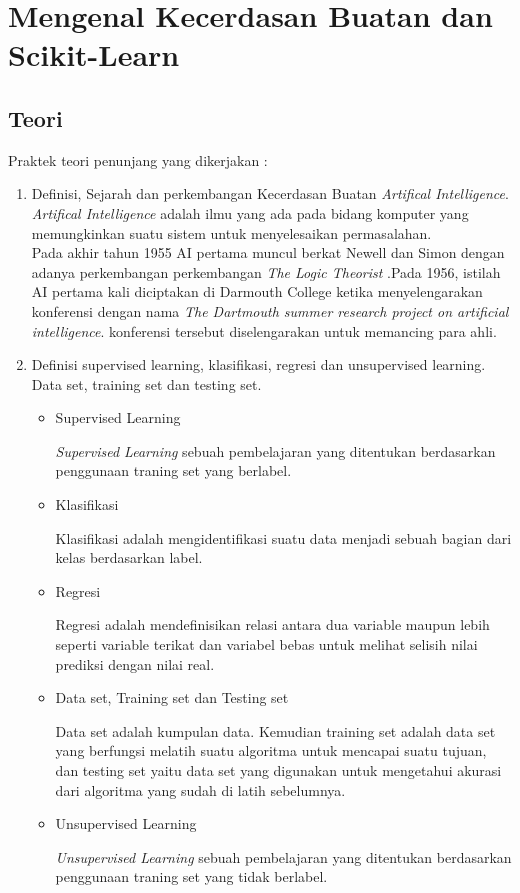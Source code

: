 \chapter{Mengenal Kecerdasan Buatan dan Scikit-Learn}

\section{Teori}
Praktek teori penunjang yang dikerjakan :
\begin{enumerate}
\item
Definisi, Sejarah dan perkembangan Kecerdasan Buatan \textit{Artifical Intelligence}. \textit{Artifical Intelligence} adalah  ilmu yang ada pada bidang komputer yang memungkinkan  suatu sistem  untuk menyelesaikan permasalahan.\\
Pada akhir tahun 1955 AI pertama muncul berkat Newell dan Simon dengan adanya perkembangan perkembangan \textit{The Logic Theorist} .Pada 1956, istilah AI pertama kali diciptakan di Darmouth College ketika menyelengarakan konferensi dengan nama \textit{The Dartmouth summer research project on artificial intelligence}. konferensi tersebut diselengarakan untuk memancing para ahli.

\item
Definisi supervised learning, klasifikasi, regresi dan unsupervised learning. Data set, training set dan testing set.
\begin{itemize}

	\item Supervised Learning
    \par
    \textit{Supervised Learning} sebuah pembelajaran yang ditentukan berdasarkan penggunaan traning set yang berlabel.

    \item Klasifikasi
    \par
    Klasifikasi adalah mengidentifikasi suatu data menjadi sebuah bagian dari kelas berdasarkan label.

	\item Regresi
	\par 
	Regresi adalah mendefinisikan relasi antara dua variable maupun lebih seperti variable terikat dan variabel bebas untuk melihat selisih nilai prediksi dengan nilai real.

    \item Data set, Training set dan Testing set
    \par
    Data set adalah kumpulan data. Kemudian training set adalah  data set yang berfungsi melatih suatu algoritma untuk mencapai suatu tujuan, dan testing set yaitu data set yang digunakan untuk mengetahui akurasi dari algoritma yang sudah di latih sebelumnya.

	\item Unsupervised Learning
	\par
	\textit{Unsupervised Learning} sebuah pembelajaran yang ditentukan berdasarkan penggunaan traning set yang tidak berlabel. 

\end{itemize}
\end{enumerate}

